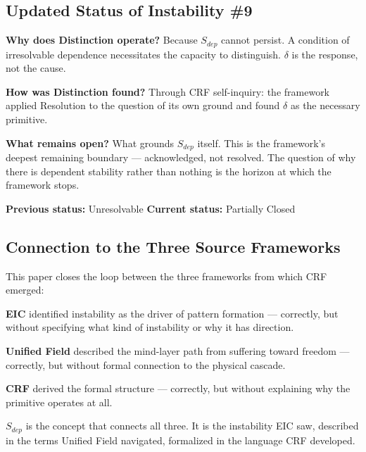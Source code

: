 \documentclass[12pt, a4paper]{article}
\begin{document}
\subsection{Updated Status of Instability \#9}

\begin{openqbox}[title={Instability \#9 --- Partially Closed (this paper)}]
\textbf{Why does Distinction operate?}
Because $S_{dep}$ cannot persist. A condition of irresolvable dependence necessitates
the capacity to distinguish. $\delta$ is the response, not the cause.

\medskip
\textbf{How was Distinction found?}
Through CRF self-inquiry: the framework applied Resolution to the question of its own
ground and found $\delta$ as the necessary primitive.

\medskip
\textbf{What remains open?}
What grounds $S_{dep}$ itself. This is the framework's deepest remaining boundary ---
acknowledged, not resolved. The question of why there is dependent stability rather
than nothing is the horizon at which the framework stops.

\medskip
\textbf{Previous status:} Unresolvable\quad
\textbf{Current status:} Partially Closed
\end{openqbox}

\subsection{Connection to the Three Source Frameworks}

This paper closes the loop between the three frameworks from which CRF emerged:

\textbf{EIC} identified instability as the driver of pattern formation --- correctly,
but without specifying what kind of instability or why it has direction.

\textbf{Unified Field} described the mind-layer path from suffering toward freedom ---
correctly, but without formal connection to the physical cascade.

\textbf{CRF} derived the formal structure --- correctly, but without explaining why
the primitive operates at all.

$S_{dep}$ is the concept that connects all three. It is the instability EIC saw,
described in the terms Unified Field navigated, formalized in the language CRF developed.
\end{document}
